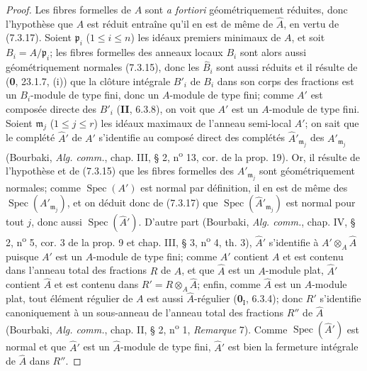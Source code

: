 \begin{proof}
Les fibres formelles de $A$ sont \emph{a fortiori} géométriquement réduites, donc
l'hypothèse que $A$ est réduit entraîne qu'il en est de même de $\widehat A$,
en vertu de (7.3.17). Soient $\mathfrak p_i$ ($1\leq i\leq n$) les idéaux
premiers minimaux de $A$, et soit $B_i=A/\mathfrak p_i$; les fibres formelles
des anneaux locaux $B_i$ sont alors aussi géométriquement normales (7.3.15),
donc les $\widehat B_i$ sont aussi réduits et il résulte de (\textbf{0}, 23.1.7, (i))
que la clôture intégrale $B'_i$ de $B_i$ dans son corps des fractions est un
$B_i$-module de type fini, donc un $A$-module de type fini; comme $A'$ est
composée directe des $B'_i$ (\textbf{II}, 6.3.8), on voit que $A'$ est un $A$-module de
type fini. Soient $\mathfrak m_j$ ($1\leq j\leq r$) les idéaux maximaux de
l'anneau semi-local $A'$; on sait que le complété $\widehat{A}'$ de $A'$
s'identifie au composé direct des complétés
$\widehat{A}'_{\mathfrak m_j}$ des $A'_{\mathfrak m_j}$ (Bourbaki,
\emph{Alg. comm.}, chap. III, § 2, n\textsuperscript{o} 13, cor. de la prop. 19).
Or, il résulte de l'hypothèse et de (7.3.15) que les fibres formelles des
$A'_{\mathfrak m_j}$ sont géométriquement normales; comme
$\operatorname{Spec}(A')$ est normal par définition, il en est de même des
$\operatorname{Spec}(A'_{\mathfrak m_j})$, et on déduit donc de (7.3.17) que
$\operatorname{Spec}(\widehat{A}'_{\mathfrak m_j})$ est normal pour tout $j$,
donc aussi $\operatorname{Spec}(\widehat{A}')$. D'autre part (Bourbaki,
\emph{Alg. comm.}, chap. IV, § 2, n\textsuperscript{o} 5, cor. 3 de la prop. 9
et chap. III, § 3, n\textsuperscript{o} 4, th. 3), $\widehat{A}'$ s'identifie
à $A'\otimes_A\widehat A$ puisque $A'$ est un $A$-module de type fini; comme
$A'$ contient $A$ et est contenu dans l'anneau total des fractions $R$ de $A$,
et que $\widehat A$ est un $A$-module plat, $\widehat{A}'$ contient
$\widehat A$ et est contenu dans $R'=R\otimes_A\widehat A$; enfin, comme
$\widehat A$ est un $A$-module plat, tout élément régulier de $A$ est aussi
$\widehat A$-régulier (\textbf{0}$_{\mathrm I}$, 6.3.4); donc $R'$ s'identifie
canoniquement à un sous-anneau de l'anneau total des fractions $R''$ de
$\widehat A$ (Bourbaki, \emph{Alg. comm.}, chap. II, § 2,
n\textsuperscript{o} 1, \emph{Remarque} 7). Comme
$\operatorname{Spec}(\widehat{A}')$ est normal et que $\widehat{A}'$ est un
$\widehat A$-module de type fini, $\widehat{A}'$ est bien la fermeture
intégrale de $\widehat A$ dans $R''$.
\end{proof}

